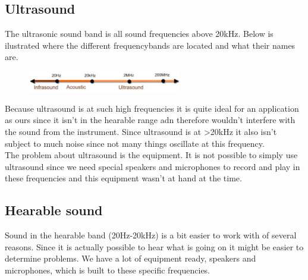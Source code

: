 \subsection{Ultrasound}
The ultrasonic sound band is all sound frequencies above 20kHz. Below is ilustrated where the different frequencybands are located and what their names are.
\begin{figure}[H]
\centering
\includegraphics[width=0.6\textwidth]{billeder/frequencybands.png}
\end{figure}
Because ultrasound is at such high frequencies it is quite ideal for an application as ours since it isn't in the hearable range adn therefore wouldn't interfere with the sound from the instrument. Since ultrasound is at >20kHz it also isn't subject to much noise since not many things oscillate at this frequency.\\
The problem about ultrasound is the equipment. It is not possible to simply use ultrasound since we need special speakers and microphones to record and play in these frequencies and this equipment wasn't at hand at the time.
\subsection{Hearable sound}
Sound in the hearable band (20Hz-20kHz) is a bit easier to work with of several reasons. Since it is actually possible to hear what is going on it might be easier to determine problems. We have a lot of equipment ready, speakers and microphones, which is built to these specific frequencies.
